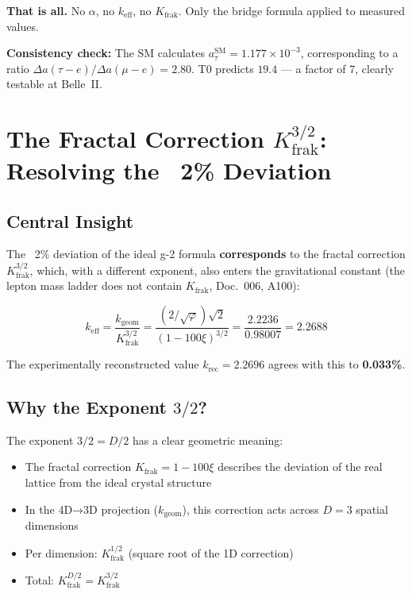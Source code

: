 	\textbf{That is all.} No $\alpha$, no $k_\text{eff}$, no $K_\text{frak}$. Only the bridge formula applied to measured values.
	
	\textbf{Consistency check:} The SM calculates $a_\tau^\text{SM} = 1.177 \times 10^{-3}$, corresponding to a ratio $\Delta a(\tau{-}e)/\Delta a(\mu{-}e) = 2.80$. T0 predicts $19.4$ --- a factor of $7$, clearly testable at Belle~II.
	
	\section{The Fractal Correction $K_\text{frak}^{3/2}$: Resolving the ~2\% Deviation}
	
	\subsection{Central Insight}
	
	The ~2\% deviation of the ideal g-2 formula \textbf{corresponds} to the fractal correction $K_\text{frak}^{3/2}$, which, with a different exponent, also enters the gravitational constant (the lepton mass ladder does not contain $K_\text{frak}$, Doc.~006, A100):
	
	\begin{equation}
		\boxed{k_\text{eff} = \frac{k_\text{geom}}{K_\text{frak}^{3/2}} = \frac{(2/\sqrt{\varphi})\sqrt{2}}{(1-100\xi)^{3/2}} = \frac{2.2236}{0.98007} = 2.2688}
	\end{equation}
	
	The experimentally reconstructed value $k_\text{rec} = 2.2696$ agrees with this to \textbf{0.033\%}.
	
	\subsection{Why the Exponent $3/2$?}
	
	The exponent $3/2 = D/2$ has a clear geometric meaning:
	\begin{itemize}
		\item The fractal correction $K_\text{frak} = 1 - 100\xi$ describes the deviation of the real lattice from the ideal crystal structure
		\item In the 4D→3D projection ($k_\text{geom}$), this correction acts across $D = 3$ spatial dimensions
		\item Per dimension: $K_\text{frak}^{1/2}$ (square root of the 1D correction)
		\item Total: $K_\text{frak}^{D/2} = K_\text{frak}^{3/2}$
	\end{itemize}
	

